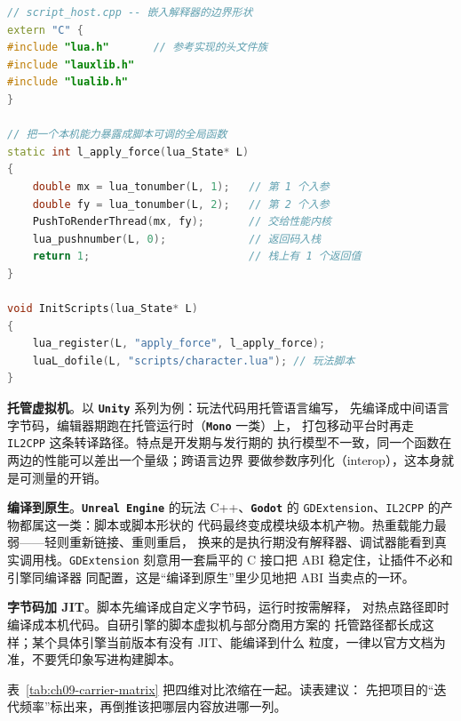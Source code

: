 \documentclass[12pt,a4paper,fontset=fandol]{ctexbook}
\newcommand{\Tp}[1]{\texttt{#1}}
\newcommand{\Lib}[1]{\textbf{\texttt{#1}}}
\newcommand{\Lang}[1]{\textsf{#1}}
\newcommand{\CL}{\Lang{C}}
\newcommand{\CPP}{\Lang{C++}}
\begin{document}
\begin{lstlisting}[language=C++, style=cppstyle,
  caption={解释型内嵌：宿主注册本机函数给 \Lib{Lua}（形状示例，接口以对应语言官方文档为准）},
  label={lst:ch09-embed-boundary}]
// script_host.cpp -- 嵌入解释器的边界形状
extern "C" {
#include "lua.h"       // 参考实现的头文件族
#include "lauxlib.h"
#include "lualib.h"
}

// 把一个本机能力暴露成脚本可调的全局函数
static int l_apply_force(lua_State* L)
{
    double mx = lua_tonumber(L, 1);   // 第 1 个入参
    double fy = lua_tonumber(L, 2);   // 第 2 个入参
    PushToRenderThread(mx, fy);       // 交给性能内核
    lua_pushnumber(L, 0);             // 返回码入栈
    return 1;                         // 栈上有 1 个返回值
}

void InitScripts(lua_State* L)
{
    lua_register(L, "apply_force", l_apply_force);
    luaL_dofile(L, "scripts/character.lua"); // 玩法脚本
}
\end{lstlisting}

\textbf{托管虚拟机}。以 \Lib{Unity} 系列为例：玩法代码用托管语言编写，
先编译成中间语言字节码，编辑器期跑在托管运行时（\Lib{Mono} 一类）上，
打包移动平台时再走 \Tp{IL2CPP} 这条转译路径。特点是开发期与发行期的
执行模型不一致，同一个函数在两边的性能可以差出一个量级；跨语言边界
要做参数序列化（interop），这本身就是可测量的开销。

\textbf{编译到原生}。\Lib{Unreal Engine} 的玩法 \CPP{}、\Lib{Godot}
的 \Tp{GDExtension}、\Tp{IL2CPP} 的产物都属这一类：脚本或脚本形状的
代码最终变成模块级本机产物。热重载能力最弱——轻则重新链接、重则重启，
换来的是执行期没有解释器、调试器能看到真实调用栈。\Tp{GDExtension}
刻意用一套扁平的 \CL{} 接口把 ABI 稳定住，让插件不必和引擎同编译器
同配置，这是``编译到原生''里少见地把 ABI 当卖点的一环。

\textbf{字节码加 JIT}。脚本先编译成自定义字节码，运行时按需解释，
对热点路径即时编译成本机代码。自研引擎的脚本虚拟机与部分商用方案的
托管路径都长成这样；某个具体引擎当前版本有没有 JIT、能编译到什么
粒度，一律以官方文档为准，不要凭印象写进构建脚本。

表~\ref{tab:ch09-carrier-matrix} 把四维对比浓缩在一起。读表建议：
先把项目的``迭代频率''标出来，再倒推该把哪层内容放进哪一列。
\end{document}
